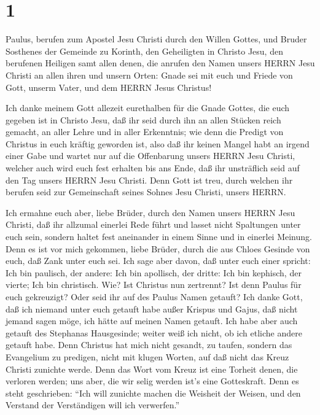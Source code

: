 \hypertarget{section}{%
\section{1}\label{section}}

 Paulus, berufen zum Apostel Jesu Christi durch den Willen
Gottes, und Bruder Sosthenes  der Gemeinde zu Korinth, den
Geheiligten in Christo Jesu, den berufenen Heiligen samt allen denen,
die anrufen den Namen unsers HERRN Jesu Christi an allen ihren und
unsern Orten:  Gnade sei mit euch und Friede von Gott,
unserm Vater, und dem HERRN Jesus Christus!

 Ich danke meinem Gott allezeit eurethalben für die Gnade
Gottes, die euch gegeben ist in Christo Jesu,  daß ihr seid
durch ihn an allen Stücken reich gemacht, an aller Lehre und in aller
Erkenntnis;  wie denn die Predigt von Christus in euch
kräftig geworden ist,  also daß ihr keinen Mangel habt an
irgend einer Gabe und wartet nur auf die Offenbarung unsers HERRN Jesu
Christi,  welcher auch wird euch fest erhalten bis ans Ende,
daß ihr unsträflich seid auf den Tag unsers HERRN Jesu Christi.
 Denn Gott ist treu, durch welchen ihr berufen seid zur
Gemeinschaft seines Sohnes Jesu Christi, unsers HERRN.

 Ich ermahne euch aber, liebe Brüder, durch den Namen
unsers HERRN Jesu Christi, daß ihr allzumal einerlei Rede führt und
lasset nicht Spaltungen unter euch sein, sondern haltet fest aneinander
in einem Sinne und in einerlei Meinung.  Denn es ist vor
mich gekommen, liebe Brüder, durch die aus Chloes Gesinde von euch, daß
Zank unter euch sei.  Ich sage aber davon, daß unter euch
einer spricht: Ich bin paulisch, der andere: Ich bin apollisch, der
dritte: Ich bin kephisch, der vierte; Ich bin christisch. 
Wie? Ist Christus nun zertrennt? Ist denn Paulus für euch gekreuzigt?
Oder seid ihr auf des Paulus Namen getauft?  Ich danke
Gott, daß ich niemand unter euch getauft habe außer Krispus und Gajus,
 daß nicht jemand sagen möge, ich hätte auf meinen Namen
getauft.  Ich habe aber auch getauft des Stephanas
Hausgesinde; weiter weiß ich nicht, ob ich etliche andere getauft habe.
 Denn Christus hat mich nicht gesandt, zu taufen, sondern
das Evangelium zu predigen, nicht mit klugen Worten, auf daß nicht das
Kreuz Christi zunichte werde.  Denn das Wort vom Kreuz ist
eine Torheit denen, die verloren werden; uns aber, die wir selig werden
ist's eine Gotteskraft.  Denn es steht geschrieben: ``Ich
will zunichte machen die Weisheit der Weisen, und den Verstand der
Verständigen will ich verwerfen.''

